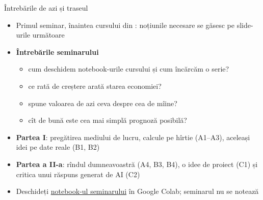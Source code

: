 \begin{frame}{Întrebările de azi și traseul}
\itemsize{\small}
\begin{itemize}
    \item Primul seminar, înaintea cursului din : noțiunile necesare se găsesc pe slide-urile următoare
    \item \textbf{Întrebările seminarului}
    \begin{itemize}
        \item cum deschidem notebook-urile cursului și cum încărcăm o serie?
        \item ce rată de creștere arată starea economiei?
        \item spune valoarea de azi ceva despre cea de mîine?
        \item cît de bună este cea mai simplă prognoză posibilă?
    \end{itemize}
    \item \textbf{Partea I}: pregătirea mediului de lucru, calcule pe hîrtie (A1--A3), aceleași idei pe date reale (B1, B2)
    \item \textbf{Partea a II-a}: rîndul dumneavoastră (A4, B3, B4), o idee de proiect (C1) și critica unui răspuns generat de AI (C2)
    \item Deschideți \href{\nb}{notebook-ul seminarului} în Google Colab; seminarul nu se notează
\end{itemize}
\end{frame}

